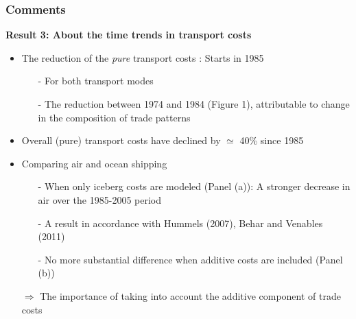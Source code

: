 \documentclass[10 pt,Helvetica, french]{beamer}
\begin{document}
\begin{frame}
\frametitle{Comments}
\textbf{Result 3: About the time trends in transport costs}
\begin{itemize}
\item The reduction of the \textit{pure} transport costs : Starts in 1985 \vspace{0.1cm}
\begin{itemize}
\item[-] For both transport modes \vspace{0.1cm}
\item[-] The reduction between 1974 and 1984 (Figure 1), attributable to change in the composition of trade patterns \vspace{0.1cm}
\end{itemize}
\item Overall (pure) transport costs have declined by $\simeq$ 40\% since 1985\vspace{0.1cm}
\item Comparing air and ocean shipping \vspace{0.1cm}
\begin{itemize}
\item[-] When only iceberg costs are modeled (Panel (a)): A stronger decrease in air over the 1985-2005 period \vspace{0.1cm}
\item[-] A result in accordance with Hummels (2007), Behar and Venables (2011) \vspace{0.1cm}
\item[-] No more substantial difference when additive costs are included (Panel (b))
\end{itemize}
\item[$\Rightarrow$] The importance of taking into account the additive component of trade costs  \vspace{0.1cm}
\end{itemize}
\end{frame}
\end{document}
